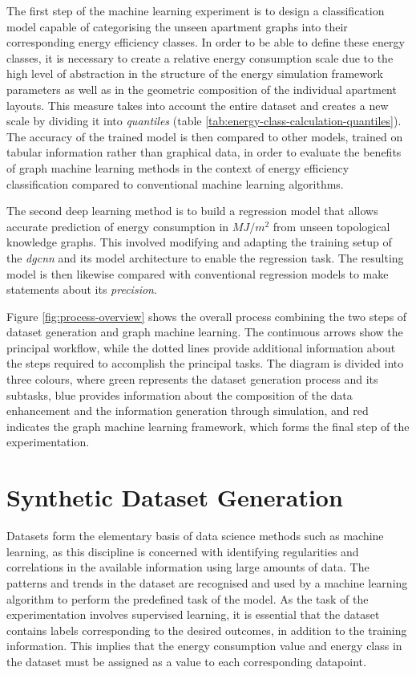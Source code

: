 \documentclass[a4paper, 12pt]{report}
\begin{document}
The first step of the machine learning experiment is to design a classification model capable of categorising the unseen apartment graphs into their corresponding energy efficiency classes. In order to be able to define these energy classes, it is necessary to create a relative energy consumption scale due to the high level of abstraction in the structure of the energy simulation framework parameters as well as in the geometric composition of the individual apartment layouts. This measure takes into account the entire dataset and creates a new scale by dividing it into \textit{\glspl{quantile}} (table \ref{tab:energy-class-calculation-quantiles}). The accuracy of the trained model is then compared to other models, trained on tabular information rather than graphical data, in order to evaluate the benefits of graph machine learning methods in the context of energy efficiency classification compared to conventional machine learning algorithms.

The second deep learning method is to build a regression model that allows accurate prediction of energy consumption in $MJ/m^2$ from unseen topological \glspl{knowledge graph}. This involved modifying and adapting the training setup of the \textit{\acrlong{dgcnn}} and its model architecture to enable the regression task. The resulting model is then likewise compared with conventional regression models to make statements about its \textit{\gls{precision}}.

Figure \ref{fig:process-overview} shows the overall process combining the two steps of dataset generation and graph machine learning. The continuous arrows show the principal workflow, while the dotted lines provide additional information about the steps required to accomplish the principal tasks. The diagram is divided into three colours, where green represents the dataset generation process and its subtasks, blue provides information about the composition of the data enhancement and the information generation through simulation, and red indicates the graph machine learning framework, which forms the final step of the experimentation.

\chapter{Synthetic Dataset Generation}\label{chap:synthetic-dataset-generation}

Datasets form the elementary basis of data science methods such as machine learning, as this discipline is concerned with identifying regularities and correlations in the available information using large amounts of data. The patterns and trends in the dataset are recognised and used by a machine learning algorithm to perform the predefined task of the model. As the task of the experimentation involves supervised learning, it is essential that the dataset contains labels corresponding to the desired outcomes, in addition to the training information. This implies that the energy consumption value and energy class in the dataset must be assigned as a value to each corresponding datapoint.
\end{document}

